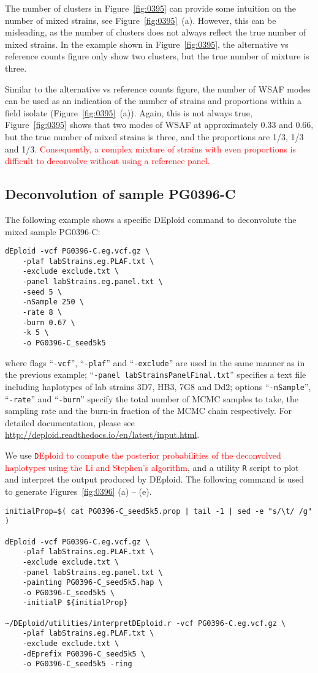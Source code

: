 \documentclass{article}
\begin{document}
The number of clusters in Figure~\ref{fig:0395} can provide some intuition on the number of mixed strains, see Figure~\ref{fig:0395}~(a). However, this can be misleading, as the number of clusters does not always reflect the true number of mixed strains. In the example shown in Figure~\ref{fig:0395}, the alternative vs reference counts figure only show two clusters, but the true number of mixture is three.

Similar to the alternative vs reference counts figure, the number of WSAF modes can be used as an indication of the number of strains and proportions within a field isolate (Figure~\ref{fig:0395}~(a)). Again, this is not always true, Figure~\ref{fig:0395} shows that two modes of WSAF at approximately 0.33 and 0.66, but the true number of mixed strains is three, and the proportions are 1/3, 1/3 and 1/3. \textcolor{red}{Consequently, a complex mixture of strains with even proportions is difficult to deconvolve without using a reference panel.}


\subsection{Deconvolution of sample {\textmd PG0396-C}}
The following example shows a specific {\textmd DEploid} command to deconvolute the mixed sample {\textmd PG0396-C}:
\linespread{1}
\begin{lstlisting}
dEploid -vcf PG0396-C.eg.vcf.gz \
    -plaf labStrains.eg.PLAF.txt \
    -exclude exclude.txt \
    -panel labStrains.eg.panel.txt \
    -seed 5 \
    -nSample 250 \
    -rate 8 \
    -burn 0.67 \
    -k 5 \
    -o PG0396-C_seed5k5
\end{lstlisting}
\linespread{1.5}
where flags ``{\tt -vcf}'', ``{\tt -plaf}'' and ``{\tt -exclude}'' are used in the same manner as in the previous example; ``{\tt -panel labStrainsPanelFinal.txt}'' specifies a text file including haplotypes of lab strains 3D7, HB3, 7G8 and Dd2; options ``{\tt -nSample}'', ``{\tt -rate}'' and ``{\tt -burn}'' specify the total number of MCMC samples to take, the sampling rate and the burn-in fraction of the MCMC chain respectively. For detailed documentation, please see \url{http://deploid.readthedocs.io/en/latest/input.html}.


We use \textcolor{red}{{\texttt DEploid} to compute the posterior probabilities of the deconvolved haplotypes using the Li and Stephen's algorithm}, and a utility {\tt R} script to plot and interpret the output produced by DEploid. The following command is used to generate Figures~\ref{fig:0396} (a) -- (e).
\linespread{1}
\begin{lstlisting}
initialProp=$( cat PG0396-C_seed5k5.prop | tail -1 | sed -e "s/\t/ /g" )

dEploid -vcf PG0396-C.eg.vcf.gz \
    -plaf labStrains.eg.PLAF.txt \
    -exclude exclude.txt \
    -panel labStrains.eg.panel.txt \
    -painting PG0396-C_seed5k5.hap \
    -o PG0396-C_seed5k5 \
    -initialP ${initialProp}

~/DEploid/utilities/interpretDEploid.r -vcf PG0396-C.eg.vcf.gz \
    -plaf labStrains.eg.PLAF.txt \
    -exclude exclude.txt \
    -dEprefix PG0396-C_seed5k5 \
    -o PG0396-C_seed5k5 -ring
\end{lstlisting}
\linespread{1.5}
\end{document}
